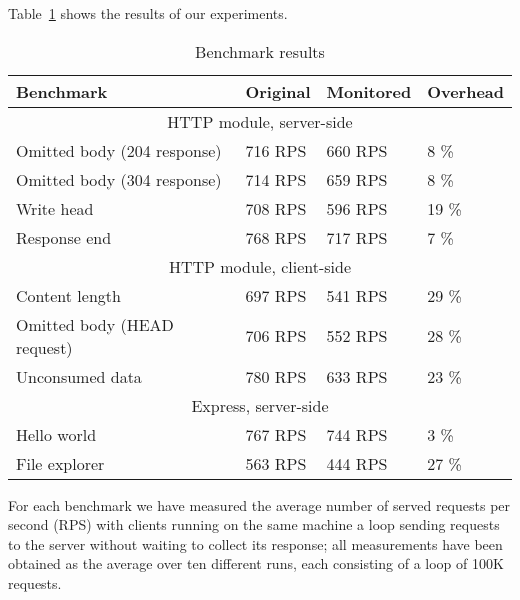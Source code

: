 Table~\ref{table} shows the results of our experiments. 
\begin{table}[ht]
  \begin{tabular}{|l|l|l|l|}
    \hline
    \textbf{Benchmark} & 
    \textbf{Original} &
    \textbf{Monitored} &
    \textbf{Overhead} \\
    \hline
    \multicolumn{4}{|c|}{HTTP module, server-side}\\
    \hline

    Omitted body (204 response)&
    716 RPS &
    660 RPS &
    8 \% \\

    Omitted body (304 response)&
    714 RPS &
    659 RPS &
    8 \% \\

    Write head &
    708 RPS &
    596 RPS &
    19 \% \\

    Response end &
    768 RPS &
    717 RPS &
    7 \% \\

    \hline

    \multicolumn{4}{|c|}{HTTP module, client-side}\\
    \hline

    Content length & 
    697 RPS &
    541 RPS &
    29 \% \\

    Omitted body (HEAD request)&
    706 RPS &
    552 RPS &
    28 \% \\

    Unconsumed data &
     780 RPS &
     633 RPS &
     23 \% \\

     \hline
    \multicolumn{4}{|c|}{Express, server-side}\\
    \hline
    Hello world & 
    767 RPS &
    744 RPS &
    3 \% \\

    File explorer &
    563 RPS &
    444 RPS &
    27 \%\\

    \hline
  \end{tabular}
  \caption{Benchmark results}
  \label{table}
\end{table}
For each benchmark we have measured the average number of served requests per second (RPS) 
with clients running on the same machine a loop sending requests to the server without waiting to collect its response;
all measurements have been obtained as the average over ten different runs, each consisting
of a loop of 100K requests.

